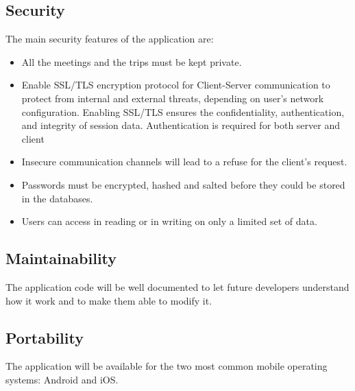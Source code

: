 \subsection{Security}
The main security features of the application are:  
\begin{itemize}
\item All the meetings and the trips must be kept private.
\item Enable SSL/TLS encryption protocol for Client-Server communication to protect from internal and external threats, depending on user’s network configuration. Enabling SSL/TLS ensures the confidentiality, authentication, and integrity of session data. Authentication is required for both server and client
\item Insecure communication channels will lead to a refuse for the client’s request.
\item Passwords must be encrypted, hashed and salted before they could be stored in the databases.
\item Users can access in reading or in writing on only a limited set of data.
\end{itemize}
%
\subsection{Maintainability}
The application code will be well documented to let future developers understand how it work and to make them able to modify it.
%
\subsection{Portability}
The application will be available for the two most common mobile operating systems: Android and iOS.


